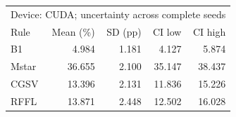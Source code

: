 \begin{tabular}{lrrrr}
\toprule
\multicolumn{5}{l}{Device: CUDA; uncertainty across complete seeds} \\
Rule & Mean (\%) & SD (pp) & CI low & CI high \\
\midrule
B1 & 4.984 & 1.181 & 4.127 & 5.874 \\
Mstar & 36.655 & 2.100 & 35.147 & 38.437 \\
CGSV & 13.396 & 2.131 & 11.836 & 15.226 \\
RFFL & 13.871 & 2.448 & 12.502 & 16.028 \\
\bottomrule
\end{tabular}

